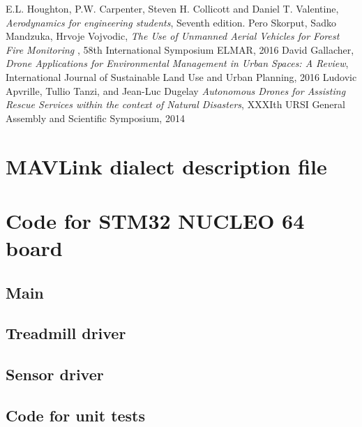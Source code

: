 \documentclass[12pt,a4paper]{article}
\begin{document}
\begin{thebibliography}{100}
	 E.L. Houghton, P.W. Carpenter, Steven H. Collicott and Daniel T. Valentine, \textit{Aerodynamics for engineering students}, Seventh edition.
	 Pero Skorput, Sadko Mandzuka, Hrvoje Vojvodic, \textit{The Use of Unmanned Aerial Vehicles for Forest Fire Monitoring }, 58th International Symposium ELMAR, 2016
	 David Gallacher, \textit{Drone Applications for Environmental Management in Urban Spaces: A Review}, International Journal of Sustainable Land Use and Urban Planning, 2016
	 Ludovic Apvrille, Tullio Tanzi, and Jean-Luc Dugelay \textit{Autonomous Drones for Assisting Rescue Services within the context of Natural Disasters}, XXXIth URSI General Assembly and Scientific Symposium, 2014
\end{thebibliography}

\listoffigures
\listoftables
\appendix
\section{MAVLink dialect description file}\label{app:mavlink}

\section{Code for STM32 NUCLEO 64 board}
\subsection{Main}


\subsection{Treadmill driver}


\subsection{Sensor driver}


\subsection{Code for unit tests}








\end{document}

